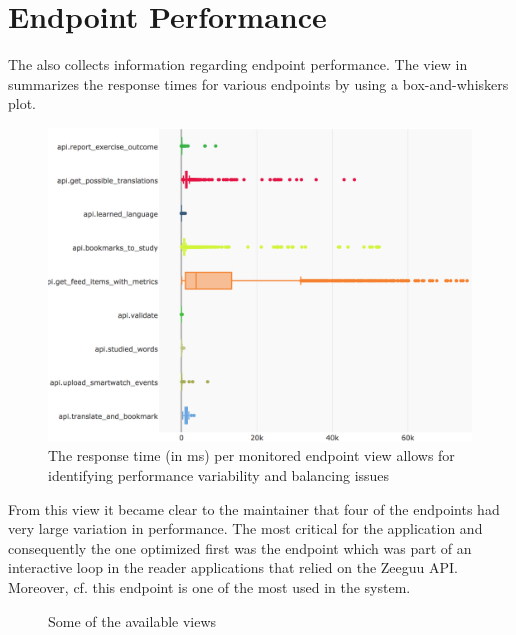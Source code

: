 \documentclass[conference]{IEEEtran}
\begin{document}
\newpage
\section{Endpoint Performance}
\label{sec:perf}


  The \tool also collects information regarding endpoint performance. The view in  summarizes the response times for various endpoints by using a box-and-whiskers plot. 


 \begin{figure}[!ht]
   \centering
   \includegraphics[width=0.95\linewidth]{endpoint_performance_}
   \caption{The response time (in ms) per monitored endpoint view allows for identifying performance variability and balancing issues}
   \label{fig:ep}
 \end{figure}

  From this view it became clear to the maintainer that four of the endpoints had very large variation in performance.   The most critical for the application and consequently the one optimized first was the \epTranslations endpoint which was part of an interactive loop in the reader applications that relied on the Zeeguu API. Moreover, cf.  this endpoint is one of the most used in the system.




\begin{figure}[h!]
  \centering
  \caption{Some of the available views\label{fig:views}}
\end{figure}
\end{document}
